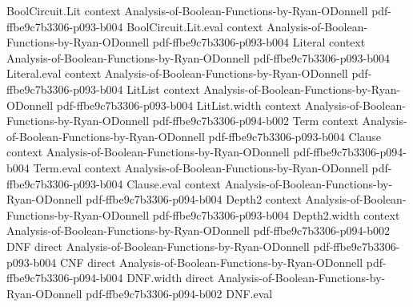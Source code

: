 \begin{theorem}
\leanok
{}
\proofstep
  {BoolCircuit.Lit}
  {context}
  {Analysis-of-Boolean-Functions-by-Ryan-ODonnell}
  {pdf-ffbe9c7b3306-p093-b004}
\proofstep
  {BoolCircuit.Lit.eval}
  {context}
  {Analysis-of-Boolean-Functions-by-Ryan-ODonnell}
  {pdf-ffbe9c7b3306-p093-b004}
\proofstep
  {Literal}
  {context}
  {Analysis-of-Boolean-Functions-by-Ryan-ODonnell}
  {pdf-ffbe9c7b3306-p093-b004}
\proofstep
  {Literal.eval}
  {context}
  {Analysis-of-Boolean-Functions-by-Ryan-ODonnell}
  {pdf-ffbe9c7b3306-p093-b004}
\proofstep
  {LitList}
  {context}
  {Analysis-of-Boolean-Functions-by-Ryan-ODonnell}
  {pdf-ffbe9c7b3306-p093-b004}
\proofstep
  {LitList.width}
  {context}
  {Analysis-of-Boolean-Functions-by-Ryan-ODonnell}
  {pdf-ffbe9c7b3306-p094-b002}
\proofstep
  {Term}
  {context}
  {Analysis-of-Boolean-Functions-by-Ryan-ODonnell}
  {pdf-ffbe9c7b3306-p093-b004}
\proofstep
  {Clause}
  {context}
  {Analysis-of-Boolean-Functions-by-Ryan-ODonnell}
  {pdf-ffbe9c7b3306-p094-b004}
\proofstep
  {Term.eval}
  {context}
  {Analysis-of-Boolean-Functions-by-Ryan-ODonnell}
  {pdf-ffbe9c7b3306-p093-b004}
\proofstep
  {Clause.eval}
  {context}
  {Analysis-of-Boolean-Functions-by-Ryan-ODonnell}
  {pdf-ffbe9c7b3306-p094-b004}
\proofstep
  {Depth2}
  {context}
  {Analysis-of-Boolean-Functions-by-Ryan-ODonnell}
  {pdf-ffbe9c7b3306-p093-b004}
\proofstep
  {Depth2.width}
  {context}
  {Analysis-of-Boolean-Functions-by-Ryan-ODonnell}
  {pdf-ffbe9c7b3306-p094-b002}
\proofstep
  {DNF}
  {direct}
  {Analysis-of-Boolean-Functions-by-Ryan-ODonnell}
  {pdf-ffbe9c7b3306-p093-b004}
\proofstep
  {CNF}
  {direct}
  {Analysis-of-Boolean-Functions-by-Ryan-ODonnell}
  {pdf-ffbe9c7b3306-p094-b004}
\proofstep
  {DNF.width}
  {direct}
  {Analysis-of-Boolean-Functions-by-Ryan-ODonnell}
  {pdf-ffbe9c7b3306-p094-b002}
\proofstep
  {DNF.eval}

\end{theorem}
